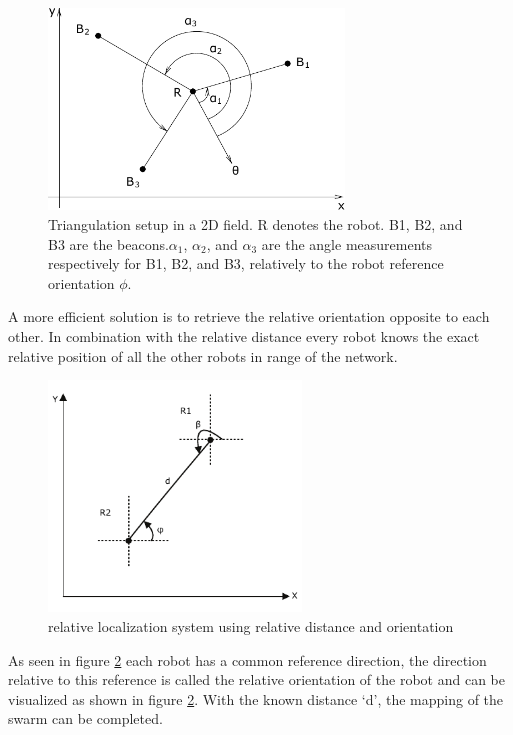 \documentclass[10pt,a4paper]{article}
\begin{document}
\begin{figure}[H]
\centering
\includegraphics[width=0.7\textwidth]{triangulation.pdf}
\caption{Triangulation setup in a 2D field. R denotes the robot. B1, B2, and B3 are the beacons.$ \alpha_1$, $\alpha_2$, and $\alpha_3$ are the angle measurements respectively for B1, B2, and B3, relatively to the robot reference orientation $\phi$. \cite{triangulation}}
\label{triangulation}
\end{figure}

A more efficient solution is to retrieve the relative orientation opposite to each other. In combination with the relative distance every robot knows the exact relative position of all the other robots in range of the network.

\begin{figure}[H]
\centering
\includegraphics[width=0.6\textwidth]{orientation.pdf}
\caption{relative localization system using relative distance and orientation}
\label{orientation}
\end{figure}

As seen in figure \ref{orientation} each robot has a common reference direction, the direction relative to this reference is called the relative orientation of the robot and can be visualized as shown in figure \ref{orientation}. With the known distance ‘d’, the mapping of the swarm can be completed.
\newpage
\end{document}
